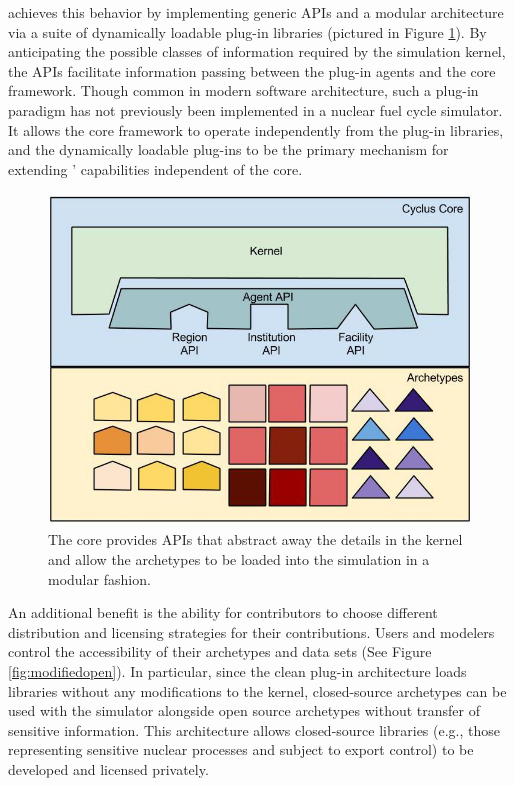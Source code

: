 \Cyclus achieves this behavior by implementing generic \glspl{API} and a
modular architecture via a suite of dynamically loadable plug-in libraries
(pictured in Figure \ref{fig:framework}). By anticipating the possible classes of
information required by the simulation kernel, the \Cyclus \glspl{API}
facilitate information passing between the plug-in agents and the core
framework.
Though common in modern software architecture, such a plug-in paradigm has not
previously been implemented in a nuclear fuel cycle simulator.
It allows the core \Cyclus framework to operate independently from the plug-in libraries, and the
dynamically loadable plug-ins to be the primary mechanism for extending \Cyclus'
capabilities independent of the core.

\begin{figure}[htbp!]
\begin{center}
\includegraphics[width=\textwidth]{./images/framework}
\end{center}
\caption{The \Cyclus core provides \gls{API}s that abstract away the details in
the kernel and allow the archetypes to be loaded into the simulation in a modular
fashion.}
\label{fig:framework}
\end{figure}


An additional benefit is the ability for
contributors to choose different distribution and licensing strategies
for their contributions. Users and modelers control the accessibility of their archetypes and data sets (See Figure \ref{fig:modifiedopen}).
In particular, since the clean plug-in architecture loads libraries without any
modifications to the \Cyclus kernel, closed-source archetypes can be used with
the simulator alongside open source archetypes without transfer of sensitive information. This architecture
allows closed-source libraries (e.g., those representing sensitive nuclear
processes and subject to export control) to be developed and licensed privately.

